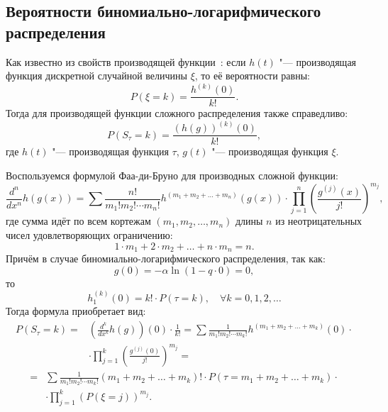 \documentclass[12pt, specialist, subf, substylefile = spbu.rtx]{disser}
\begin{document}
	\subsection{Вероятности биномиально-логарифмического распределения}
	
	\label{sec:probBLR}
	
	Как известно из свойств производящей функции~\cite{bib:feller1952}: если $ h(t) $ "--- производящая функция дискретной случайной величины $ \xi $, то её вероятности равны:
	\[
		P(\xi = k) = \frac{h ^{(k)}(0)} {k!}.
	\]
	Тогда для производящей функции сложного распределения также справедливо:
	\[
		P(S _\tau = k) = \frac{\left(h(g) \right) ^{(k)}(0)} {k!}, 
	\]
	где $ h(t) $ "--- производящая функция $ \tau $, $ g(t) $ "--- производящая функция $ \xi $.
	
	Воспользуемся формулой Фаа-ди-Бруно для производных сложной функции:
	\[
		\frac {d ^n} {d x ^n} h(g(x)) = \sum \frac {n!} {m _1! m _2! \cdots m _n!} h ^{(m _1 + m _2 + \dots + m _n)} (g(x)) \cdot \prod \limits ^{n} _{j = 1} \left( \frac{g ^{(j)} (x)} {j!} \right) ^{m _j},
	\]
	где сумма идёт по всем кортежам $ (m _1, m _2, \dots, m _n) $ длины $ n $ из неотрицательных чисел удовлетворяющих ограничению:
	\[
		1 \cdot m _1 + 2 \cdot m _2 + \dots + n \cdot m _n = n.
	\]
	Причём в случае биномиально-логарифмического распределения, так как:
	\[ 
		g(0) = - \alpha \ln (1 - q \cdot 0) = 0, 
	\]
	то
	\[ 
		h _1 ^{(k)} (0) = k! \cdot P(\tau = k), \quad \forall k = 0, 1, 2, \dots
	\]
	Тогда формула приобретает вид:
	\[ 
		\begin{aligned}
			P(S _\tau = k) =& \left(\frac {d ^k} {d x ^k} 	h(g)\right)(0) \cdot \frac 1 {k!} = \sum \frac 1 {m _1! m _2! \cdots m _k!} h ^{(m _1 + m _2 + \dots + m _k)} (0) \cdot\\
			&\cdot \prod \limits ^{k} _{j = 1} \left( \frac{g ^{(j)} (0)} {j!} \right) ^{m _j} =
		\end{aligned}
	\]
	\[
		\begin{aligned}
			=& \sum \frac 1 {m _1! m _2! \cdots m _k!} (m _1 + m _2 + \dots + m _k)! \cdot P(\tau = m _1 + m _2 + \dots + m _k) \cdot\\
			&\cdot \prod \limits ^{k} _{j = 1} \left( P(\xi = j)  \right) ^{m _j}.
		\end{aligned}
	\]
	
\end{document}
